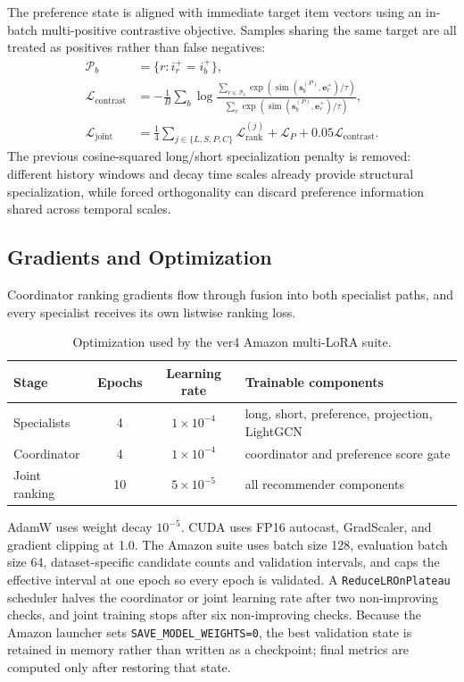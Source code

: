 \documentclass[11pt,a4paper]{article}
\begin{document}
The preference state is aligned with immediate target item vectors using an
in-batch multi-positive contrastive objective. Samples sharing the same target
are all treated as positives rather than false negatives:
\begin{align}
  \mathcal P_b&=\{r:i_r^+=i_b^+\},\\
  \mathcal L_{\mathrm{contrast}}
  &=
  -\frac1B\sum_b\log
  \frac{\sum_{r\in\mathcal P_b}
    \exp(\operatorname{sim}(\bm s_b^{(P)},\bm e_r^+)/\tau)}
  {\sum_r\exp(\operatorname{sim}(\bm s_b^{(P)},\bm e_r^+)/\tau)},\\
  \mathcal L_{\mathrm{joint}}
  &=
  \frac14\sum_{j\in\{L,S,P,C\}}\mathcal L_{\mathrm{rank}}^{(j)}
  +\mathcal L_P+0.05\mathcal L_{\mathrm{contrast}}.
\end{align}
The previous cosine-squared long/short specialization penalty is removed:
different history windows and decay time scales already provide structural
specialization, while forced orthogonality can discard preference information
shared across temporal scales.

\subsection{Gradients and Optimization}

Coordinator ranking gradients flow through fusion into both specialist paths,
and every specialist receives its own listwise ranking loss.

\begin{table}[H]
\centering
\caption{Optimization used by the ver4 Amazon multi-LoRA suite.}
\begin{tabular}{lccl}
\toprule
Stage & Epochs & Learning rate & Trainable components\\
\midrule
Specialists & 4 & $1\times10^{-4}$ & long, short, preference, projection, LightGCN\\
Coordinator & 4 & $1\times10^{-4}$ & coordinator and preference score gate\\
Joint ranking & 10 & $5\times10^{-5}$ & all recommender components\\
\bottomrule
\end{tabular}
\end{table}
AdamW uses weight decay $10^{-5}$. CUDA uses FP16 autocast, GradScaler, and gradient clipping at 1.0. The Amazon suite uses batch size 128, evaluation batch size 64, dataset-specific candidate counts and validation intervals, and caps the effective interval at one epoch so every epoch is validated. A \texttt{ReduceLROnPlateau} scheduler halves the coordinator or joint learning rate after two non-improving checks, and joint training stops after six non-improving checks. Because the Amazon launcher sets \texttt{SAVE\_MODEL\_WEIGHTS=0}, the best validation state is retained in memory rather than written as a checkpoint; final metrics are computed only after restoring that state.
\end{document}
